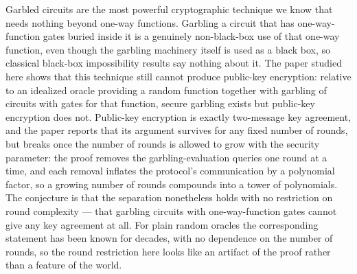 \documentclass{aicr-conjecture}
\begin{document}

\vspace{0.4em}

\begin{informalconjecture}
Garbled circuits are the most powerful cryptographic technique we know
that needs nothing beyond one-way functions. Garbling a circuit that has
one-way-function gates buried inside it is a genuinely non-black-box use
of that one-way function, even though the garbling machinery itself is
used as a black box, so classical black-box impossibility results say
nothing about it. The paper studied here shows that this technique still
cannot produce public-key encryption: relative to an idealized oracle
providing a random function together with garbling of circuits with gates
for that function, secure garbling exists but public-key encryption does
not. Public-key encryption is exactly two-message key agreement, and the
paper reports that its argument survives for any fixed number of rounds,
but breaks once the number of rounds is allowed to grow with the security
parameter: the proof removes the garbling-evaluation queries one round at
a time, and each removal inflates the protocol's communication by a
polynomial factor, so a growing number of rounds compounds into a tower
of polynomials. The conjecture is that the separation nonetheless holds
with no restriction on round complexity --- that garbling circuits with
one-way-function gates cannot give any key agreement at all. For plain
random oracles the corresponding statement has been known for decades,
with no dependence on the number of rounds, so the round restriction here
looks like an artifact of the proof rather than a feature of the world.
\end{informalconjecture}
\end{document}
